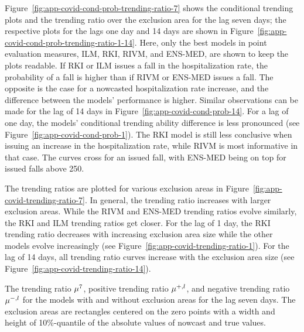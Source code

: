 Figure~\ref{fig:app-covid-cond-prob-trending-ratio-7} shows the conditional trending plots and the trending ratio over the exclusion area for the lag seven days; the respective plots for the lags one day and 14 days are shown in Figure~\ref{fig:app-covid-cond-prob-trending-ratio-1-14}.
Here, only the best models in point evaluation measures, ILM, RKI, RIVM, and ENS-MED, are shown to keep the plots readable.
If RKI or ILM issues a fall in the hospitalization rate, the probability of a fall is higher than if RIVM or ENS-MED issues a fall.
The opposite is the case for a nowcasted hospitalization rate increase, and the difference between the models' performance is higher.
Similar observations can be made for the lag of 14 days in Figure~\ref{fig:app-covid-cond-prob-14}.
For a lag of one day, the models' conditional trending ability difference is less pronounced (see Figure~\ref{fig:app-covid-cond-prob-1}).
The RKI model is still less conclusive when issuing an increase in the hospitalization rate, while RIVM is most informative in that case.
The curves cross for an issued fall, with ENS-MED being on top for issued falls above 250.

The trending ratios are plotted for various exclusion areas in Figure~\ref{fig:app-covid-trending-ratio-7}.
In general, the trending ratio increases with larger exclusion areas.
While the RIVM and ENS-MED trending ratios evolve similarly, the RKI and ILM trending ratios get closer.
For the lag of 1 day, the RKI trending ratio decreases with increasing exclusion area size while the other models evolve increasingly (see Figure~\ref{fig:app-covid-trending-ratio-1}).
For the lag of 14 days, all trending ratio curves increase with the exclusion area size (see Figure~\ref{fig:app-covid-trending-ratio-14}).


\begin{table}
    \centering
    \tiny
    
    \caption{The trending ratio $\accl[7]$, positive trending ratio $\accpl[l]$, and negative trending ratio $\accml[l]$ for the models with and without exclusion areas for the lag seven days. The exclusion areas are rectangles centered on the zero points with a width and height of 10\%-quantile of the absolute values of nowcast and true values. }
    \label{tab:app-covid-trending-ratios-lag-7}
\end{table}

